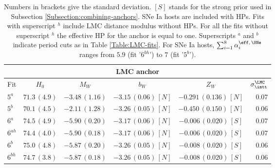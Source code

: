 \begin{table}[tbp]
\centering
\begin{tabular}{@{}lccccr}
\hline 
\multicolumn{6}{c}{LMC anchor} \\
\hline 
Fit & $H_0$ & $M_W$ & $b_W$ & $Z_W$ & $\sigma_{\intt}^{\LMC}$ \\
\hline
$5^a$ & $71.3\,(4.9)$& $-3.48\,(1.16)$ & $-3.15\,(0.06)\,[N]$& $-0.291\,(0.136)\,[N]$ & $0.07$ \\
 
$5^b$ & $70.1\,(4.5)$& $-2.11\,(1.28)$ & $-3.26\,(0.05)\,[N]$& $-0.450\,(0.150)\,[N]$ & $ 0.06$ \\	
  
$6^a$ & $74.5\,(4.9)$& $-5.90\,(0.20)$& $-3.17\,(0.06)\,[N]$& $-0.006\,(0.020)\,[S]$ & $0.07$ \\

$6^{ah}$ & $74.4\,(4.0)$& $-5.90\,(0.18)$& $-3.17\,(0.06)\,[N]$& $-0.006\,(0.020)\,[S]$& $0.07$ \\

$6^b$ & $75.0\,(4.8)$& $-5.87\,(0.20)$& $-3.26\,(0.05)\,[N]$& $-0.008\,(0.020)\,[S]$ & $ 0.06$ \\
   
$6^{bh}$ & $74.7\,(3.8)$& $-5.87\,(0.18)$& $-3.26\,(0.05)\,[N]$& $-0.008\,(0.020)\,[S]$& $ 0.06$ \\
   
\hline   
\end{tabular}
\caption{\label{Table:LMC-fits-anchor} Numbers in brackets give the standard deviation. $[S]$ stands for the strong prior used in Subsection \ref{Subsection:combining-anchors}. SNe Ia hosts are included with HPs. Fits with superscript $^h$ include LMC distance modulus without HPs. For all the fits without superscript $^h$ the effective HP for the anchor is equal to one. Superscripts $^a$ and $^b$ indicate period cuts as in Table \ref{Table:LMC-fits}. For SNe Ia hosts, $\sum_{i=1}^{8}  \alpha^{\eff,\,\SNe}_{i}$ ranges from $5.9$ (fit '$6^{bh}$') to $7$ (fit '$5^b$').}
\end{table}

